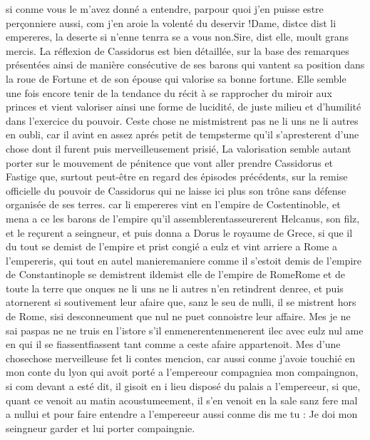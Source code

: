 \documentclass{article}
\begin{document}
\begin{pages}
      si conme vous le m’avez donné a entendre, parpour quoi j’en puisse 
      estre perçonniere aussi, com j’en aroie la volenté du deservir !Dame, distce dist 
      li empereres, la deserte si n’enne 
      tenrra se a vous non.Sire, dist elle, moult grans mercis.
   La réflexion de Cassidorus est bien détaillée, sur la base des remarques présentées ainsi de manière
   consécutive de ses barons qui vantent sa position dans la roue de Fortune et de son épouse qui valorise sa bonne fortune. 
   Elle semble une fois encore tenir de la tendance du récit à se rapprocher du miroir aux princes et vient valoriser ainsi une forme
   de lucidité, de juste milieu et d'humilité dans l'exercice du pouvoir. \pend
\pstart Ceste chose ne mistmistrent pas ne li uns 
   ne li autres en oubli, car il avint en assez aprés petit de 
   tempsterme 
   qu’il s’apresterent d’une chose dont il furent puis merveilleusement prisié, 
   La valorisation semble autant porter sur le mouvement de pénitence que vont aller prendre Cassidorus et 
   Fastige que, surtout peut-être en regard des épisodes précédents, sur la remise officielle du pouvoir de Cassidorus qui ne laisse
   ici plus son trône sans défense organisée de ses terres. car li empereres vint 
   en l’empire de Costentinoble, et mena a ce les barons de l’empire qu’il 
   assemblerentasseurerent
   Helcanus, son filz, et le reçurent a seingneur,
   et puis donna a Dorus le royaume de Grece,
   si que il du tout se demist de l’empire et prist congié a eulz et vint arriere a Rome
   a l’empereris, qui tout en autel 
   manieremaniere comme il s'estoit demis de l'empire de Constantinople 
   se demistrent ildemist elle de l’empire de 
   RomeRome et de toute la terre que onques ne li uns
   ne li autres n'en retindrent denree, et puis atornerent si soutivement leur afaire que, sanz le seu de nulli, 
   il se mistrent hors de Rome, sisi desconneument
   que nul ne puet connoistre leur affaire. Mes je ne sai 
      paspas ne ne truis en l'istore s’il 
   enmenerentenmenerent ilec avec eulz nul 
   ame en qui il se 
   fiassentfiassent tant comme a ceste afaire appartenoit.
   Mes d’une chosechose merveilleuse fet li contes mencion, 
      car aussi conme j’avoie touchié en mon conte du lyon qui avoit porté 
   a l'empereour compagniea mon compaingnon,
   si com devant a esté dit, il gisoit en i lieu disposé du palais a 
   l’empereeur, si que, quant ce venoit au matin acoustumeement, il s’en venoit en la sale 
   sanz fere mal a nullui et pour faire entendre a l’empereeur aussi conme dis me tu :
   Je doi mon seingneur garder et lui porter compaingnie.

\end{pages}
\end{document}
